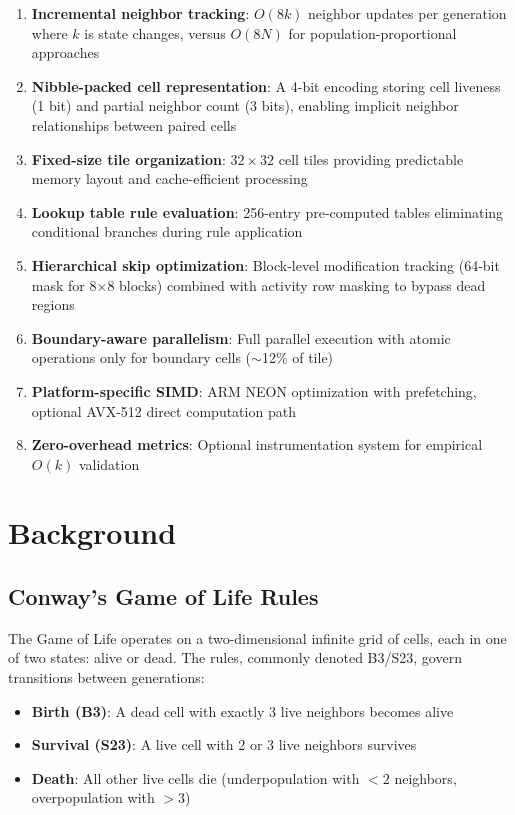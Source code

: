 \documentclass[11pt]{article}
\theoremstyle{definition}
\begin{document}
    \begin{enumerate}
        \item \textbf{Incremental neighbor tracking}: $O(8k)$ neighbor updates per generation where $k$ is state changes, versus $O(8N)$ for population-proportional approaches
        \item \textbf{Nibble-packed cell representation}: A 4-bit encoding storing cell liveness (1 bit) and partial neighbor count (3 bits), enabling implicit neighbor relationships between paired cells
        \item \textbf{Fixed-size tile organization}: $32 \times 32$ cell tiles providing predictable memory layout and cache-efficient processing
        \item \textbf{Lookup table rule evaluation}: 256-entry pre-computed tables eliminating conditional branches during rule application
        \item \textbf{Hierarchical skip optimization}: Block-level modification tracking (64-bit mask for 8$\times$8 blocks) combined with activity row masking to bypass dead regions
        \item \textbf{Boundary-aware parallelism}: Full parallel execution with atomic operations only for boundary cells ($\sim$12\% of tile)
        \item \textbf{Platform-specific SIMD}: ARM NEON optimization with prefetching, optional AVX-512 direct computation path
        \item \textbf{Zero-overhead metrics}: Optional instrumentation system for empirical $O(k)$ validation
    \end{enumerate}

    \section{Background}

    \subsection{Conway's Game of Life Rules}

    The Game of Life operates on a two-dimensional infinite grid of cells, each in one of two states: alive or dead. The rules, commonly denoted B3/S23, govern transitions between generations:

    \begin{itemize}
        \item \textbf{Birth (B3)}: A dead cell with exactly 3 live neighbors becomes alive
        \item \textbf{Survival (S23)}: A live cell with 2 or 3 live neighbors survives
        \item \textbf{Death}: All other live cells die (underpopulation with $<2$ neighbors, overpopulation with $>3$)
    \end{itemize}
\end{document}
